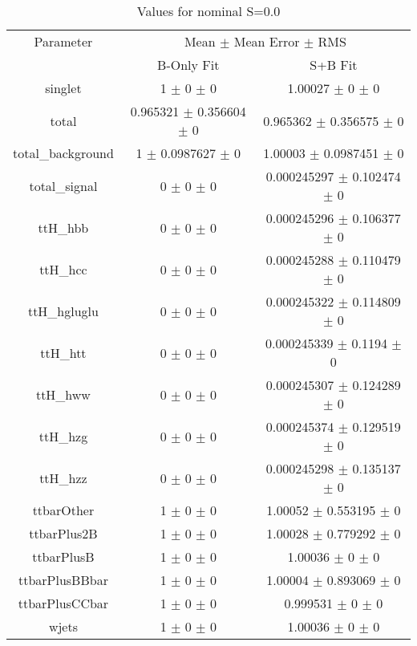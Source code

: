 \begin{table}
\centering
\caption{Values for nominal S=0.0}
\begin{tabular}{ccc}
\toprule
Parameter & \multicolumn{2}{c}{Mean $\pm$ Mean Error $\pm$ RMS}\\
 & B-Only Fit & S+B Fit\\
\midrule
singlet & \num{1} $\pm$ \num{0} $\pm$ \num{0} & \num{1.00027} $\pm$ \num{0} $\pm$ \num{0}\\
total & \num{0.965321} $\pm$ \num{0.356604} $\pm$ \num{0} & \num{0.965362} $\pm$ \num{0.356575} $\pm$ \num{0}\\
total\_background & \num{1} $\pm$ \num{0.0987627} $\pm$ \num{0} & \num{1.00003} $\pm$ \num{0.0987451} $\pm$ \num{0}\\
total\_signal & \num{0} $\pm$ \num{0} $\pm$ \num{0} & \num{0.000245297} $\pm$ \num{0.102474} $\pm$ \num{0}\\
ttH\_hbb & \num{0} $\pm$ \num{0} $\pm$ \num{0} & \num{0.000245296} $\pm$ \num{0.106377} $\pm$ \num{0}\\
ttH\_hcc & \num{0} $\pm$ \num{0} $\pm$ \num{0} & \num{0.000245288} $\pm$ \num{0.110479} $\pm$ \num{0}\\
ttH\_hgluglu & \num{0} $\pm$ \num{0} $\pm$ \num{0} & \num{0.000245322} $\pm$ \num{0.114809} $\pm$ \num{0}\\
ttH\_htt & \num{0} $\pm$ \num{0} $\pm$ \num{0} & \num{0.000245339} $\pm$ \num{0.1194} $\pm$ \num{0}\\
ttH\_hww & \num{0} $\pm$ \num{0} $\pm$ \num{0} & \num{0.000245307} $\pm$ \num{0.124289} $\pm$ \num{0}\\
ttH\_hzg & \num{0} $\pm$ \num{0} $\pm$ \num{0} & \num{0.000245374} $\pm$ \num{0.129519} $\pm$ \num{0}\\
ttH\_hzz & \num{0} $\pm$ \num{0} $\pm$ \num{0} & \num{0.000245298} $\pm$ \num{0.135137} $\pm$ \num{0}\\
ttbarOther & \num{1} $\pm$ \num{0} $\pm$ \num{0} & \num{1.00052} $\pm$ \num{0.553195} $\pm$ \num{0}\\
ttbarPlus2B & \num{1} $\pm$ \num{0} $\pm$ \num{0} & \num{1.00028} $\pm$ \num{0.779292} $\pm$ \num{0}\\
ttbarPlusB & \num{1} $\pm$ \num{0} $\pm$ \num{0} & \num{1.00036} $\pm$ \num{0} $\pm$ \num{0}\\
ttbarPlusBBbar & \num{1} $\pm$ \num{0} $\pm$ \num{0} & \num{1.00004} $\pm$ \num{0.893069} $\pm$ \num{0}\\
ttbarPlusCCbar & \num{1} $\pm$ \num{0} $\pm$ \num{0} & \num{0.999531} $\pm$ \num{0} $\pm$ \num{0}\\
wjets & \num{1} $\pm$ \num{0} $\pm$ \num{0} & \num{1.00036} $\pm$ \num{0} $\pm$ \num{0}\\
\bottomrule
\end{tabular}
\end{table}